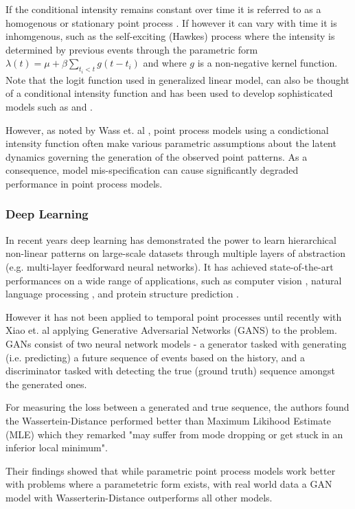 If the conditional intensity remains constant over time it is referred to as a homogenous or stationary point process \parencite{Nok}. If however it can vary with time it is inhomgenous, such as the self-exciting (Hawkes) process where the intensity is determined by previous events through the parametric form $\lambda(t) = \mu + \beta \sum_{t_i<t}g(t-t_i)$ and where $g$ is a non-negative kernel function. Note that the logit function used in generalized linear model, can also be thought of a conditional intensity function and has been used to develop sophisticated models such as \parencite{baddeley2014logistic} and \parencite{rajala2014note}.

However, as noted by Wass et. al \parencite{Wass}, point process models using a condictional intensity function often make various parametric assumptions about the latent dynamics governing the generation of the observed point patterns. As a consequence, model mis-specification can cause significantly degraded performance in point process models.

\subsubsection{Deep Learning}

In recent years deep learning has demonstrated the power to learn hierarchical non-linear patterns on large-scale datasets \parencite{DL} through multiple layers of abstraction (e.g. multi-layer feedforward neural networks). It has achieved state-of-the-art performances on a wide range of applications, such as computer vision \parencite{ImageNet}, natural language processing \parencite{Socher}, and protein structure prediction \parencite{Lena}.

However it has not been applied to temporal point processes until recently with Xiao et. al \parencite{Wass} applying Generative Adversarial Networks (GANS) to the problem. GANs consist of two neural network models - a generator tasked with generating (i.e. predicting) a future sequence of events based on the history, and a discriminator tasked with detecting the true (ground truth) sequence amongst the generated ones.

For measuring the loss between a generated and true sequence, the authors found the Wassertein-Distance \parencite{WassGAN} performed better than Maximum Likihood Estimate (MLE) which they remarked "may suffer from mode dropping or get stuck in an inferior local minimum".

Their findings showed that while parametric point process models work better with problems where a parametetric form exists, with real world data a GAN model with Wasserterin-Distance outperforms all other models. 

